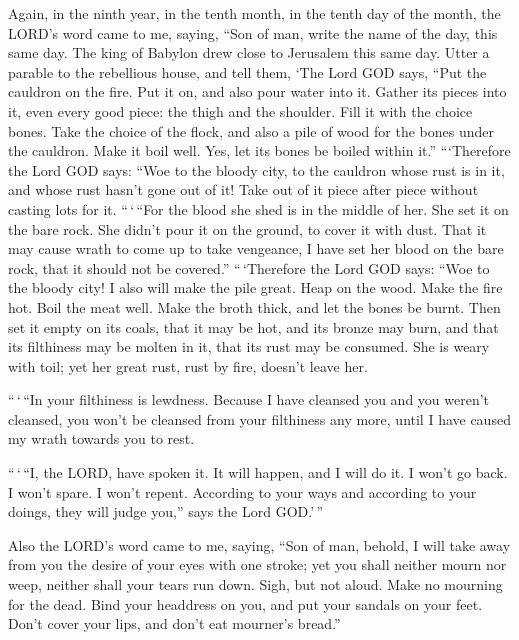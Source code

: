  Again, in the ninth year, in the tenth month, in the tenth
day of the month, the LORD's word came to me, saying,  ``Son
of man, write the name of the day, this same day. The king of Babylon
drew close to Jerusalem this same day.  Utter a parable to
the rebellious house, and tell them, `The Lord GOD says, ``Put the
cauldron on the fire. Put it on, and also pour water into it.
 Gather its pieces into it, even every good piece: the thigh
and the shoulder. Fill it with the choice bones.  Take the
choice of the flock, and also a pile of wood for the bones under the
cauldron. Make it boil well. Yes, let its bones be boiled within it.''
 ```Therefore the Lord GOD says: ``Woe to the bloody city,
to the cauldron whose rust is in it, and whose rust hasn't gone out of
it! Take out of it piece after piece without casting lots for it.
 ``\,`\,``For the blood she shed is in the middle of her.
She set it on the bare rock. She didn't pour it on the ground, to cover
it with dust.  That it may cause wrath to come up to take
vengeance, I have set her blood on the bare rock, that it should not be
covered.''  ``\,`Therefore the Lord GOD says: ``Woe to the
bloody city! I also will make the pile great.  Heap on the
wood. Make the fire hot. Boil the meat well. Make the broth thick, and
let the bones be burnt.  Then set it empty on its coals,
that it may be hot, and its bronze may burn, and that its filthiness may
be molten in it, that its rust may be consumed.  She is
weary with toil; yet her great rust, rust by fire, doesn't leave her.

 ``\,`\,``In your filthiness is lewdness. Because I have
cleansed you and you weren't cleansed, you won't be cleansed from your
filthiness any more, until I have caused my wrath towards you to rest.

 ``\,`\,``I, the LORD, have spoken it. It will happen, and
I will do it. I won't go back. I won't spare. I won't repent. According
to your ways and according to your doings, they will judge you,'' says
the Lord GOD.'\,''

 Also the LORD's word came to me, saying, 
``Son of man, behold, I will take away from you the desire of your eyes
with one stroke; yet you shall neither mourn nor weep, neither shall
your tears run down.  Sigh, but not aloud. Make no mourning
for the dead. Bind your headdress on you, and put your sandals on your
feet. Don't cover your lips, and don't eat mourner's bread.''

